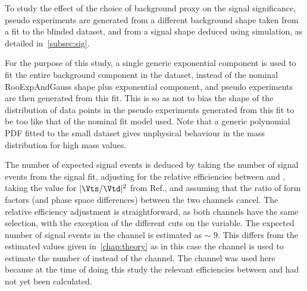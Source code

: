 To study the effect of the choice of background proxy on the signal significance, pseudo experiments are generated from a different background shape taken from a fit to the blinded \Lbpi dataset, and from a signal shape deduced using simulation, as detailed in~\autoref{subsec:sig}.%

For the purpose of this study, a single generic exponential component is used to fit the entire background component in the \Lbpi dataset, instead of the nominal RooExpAndGauss shape plus exponential component, and pseudo experiments are then generated from this fit. 
This is so as not to bias the shape of the distribution of data points in the pseudo experiments generated from this fit to be too like that of the nominal fit model used. Note that a generic polynomial PDF fitted to the small \Lbpi dataset gives unphysical behaviour in the mass distribution for high mass values. 



The number of expected signal events is deduced by taking the number of signal events from the \LbK signal fit, adjusting for the relative efficiencies between \Lbpi and \LbK, taking the value for $|\Vts/\Vtd|^{2}$ from Ref.\cite{vtdvts}, and assuming that the ratio of form factors (and phase space differences) between the two channels cancel. The relative efficiency adjustment is straightforward, as both channels have the same selection, with the exception of the different cuts on the \dllkpi variable. The expected number of signal events in the \Lbpi channel is estimated as $\sim$ 9. This differs from the estimated values given in~\autoref{chap:theory} as in this case the \LbK channel is used to estimate the number of \Lbpi instead of the \Lbpijpsi channel. The \LbK channel was used here because at the time of doing this study the relevant efficiencies between \Lbpi and \Lbpijpsi had not yet been calculated.





